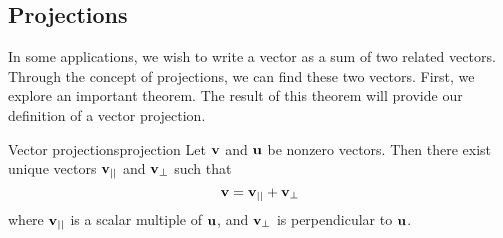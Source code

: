 \subsection{Projections}

In some applications, we wish to write a vector as a sum of two related vectors. Through the concept of projections, we can find these two vectors. First, we explore an important theorem. The result of 
this theorem will provide our definition of a vector projection.

\begin{theorem}{Vector projections}{projection}
Let ${\bf v}$ and ${\bf u}$ be nonzero vectors. Then
there exist unique vectors ${\bf v}_{||}$ and ${\bf v}_{\bot }$ such
that
\begin{equation}
{\bf v}={\bf v}_{||}+{\bf v}_{\bot }  \label{projection}
\end{equation}
where ${\bf v}_{||}$ is a scalar multiple of ${\bf u}$, 
and ${\bf v}_{\bot}$ is perpendicular to ${\bf u}$.

\end{theorem}

